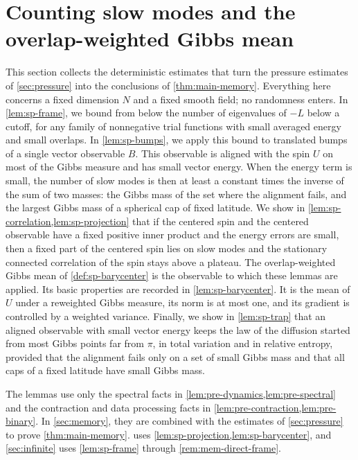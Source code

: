 \chapter{Counting slow modes and the overlap-weighted Gibbs mean}\label{sec:spectral}

This section collects the deterministic estimates that turn the pressure estimates of \cref{sec:pressure} into the conclusions of \cref{thm:main-memory}. Everything here concerns a fixed dimension $N$ and a fixed smooth field; no randomness enters. In \cref{lem:sp-frame}, we bound from below the number of eigenvalues of $-L$ below a cutoff, for any family of nonnegative trial functions with small averaged energy and small overlaps. In \cref{lem:sp-bumps}, we apply this bound to translated bumps of a single vector observable $B$. This observable is aligned with the spin $U$ on most of the Gibbs measure and has small vector energy. When the energy term is small, the number of slow modes is then at least a constant times the inverse of the sum of two masses: the Gibbs mass of the set where the alignment fails, and the largest Gibbs mass of a spherical cap of fixed latitude. We show in \cref{lem:sp-correlation,lem:sp-projection} that if the centered spin and the centered observable have a fixed positive inner product and the energy errors are small, then a fixed part of the centered spin lies on slow modes and the stationary connected correlation of the spin stays above a plateau. The overlap-weighted Gibbs mean of \cref{def:sp-barycenter} is the observable to which these lemmas are applied. Its basic properties are recorded in \cref{lem:sp-barycenter}. It is the mean of $U$ under a reweighted Gibbs measure, its norm is at most one, and its gradient is controlled by a weighted variance. Finally, we show in \cref{lem:sp-trap} that an aligned observable with small vector energy keeps the law of the diffusion started from most Gibbs points far from $\pi$, in total variation and in relative entropy, provided that the alignment fails only on a set of small Gibbs mass and that all caps of a fixed latitude have small Gibbs mass.

The lemmas use only the spectral facts in \cref{lem:pre-dynamics,lem:pre-spectral} and the contraction and data processing facts in \cref{lem:pre-contraction,lem:pre-binary}. In \cref{sec:memory}, they are combined with the estimates of \cref{sec:pressure} to prove \cref{thm:main-memory}.  uses \cref{lem:sp-projection,lem:sp-barycenter}, and \cref{sec:infinite} uses \cref{lem:sp-frame} through \cref{rem:mem-direct-frame}.

